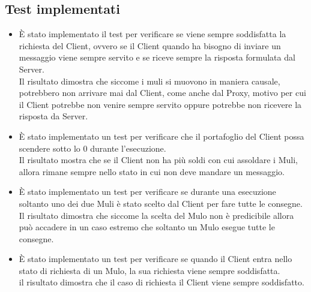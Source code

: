 \documentclass[13pt,a4paper]{article}
\begin{document}
\subsection{Test implementati}
\begin{itemize}
	\item È stato implementato il test per verificare se viene sempre soddisfatta la richiesta del Client, ovvero se il Client quando ha bisogno di inviare un messaggio viene sempre servito e se riceve sempre la risposta formulata dal Server.\\
	Il risultato dimostra che siccome i muli si muovono in maniera causale, potrebbero non arrivare mai dal Client, come anche dal Proxy, motivo per cui il Client potrebbe non venire sempre servito oppure potrebbe non ricevere la risposta da Server.
	\item È stato implementato un test per verificare che il portafoglio del Client possa scendere sotto lo 0 durante l'esecuzione.\\
	Il risultato mostra che se il Client non ha più soldi con cui assoldare i Muli, allora rimane sempre nello stato in cui non deve mandare un messaggio.
	\item È stato implementato un test per verificare se durante una esecuzione soltanto uno dei due Muli è stato scelto dal Client per fare tutte le consegne.\\
	Il risultato dimostra che siccome la scelta del Mulo non è predicibile allora può accadere in un caso estremo che soltanto un Mulo esegue tutte le consegne.
	\item È stato implementato un test per verificare se quando il Client entra nello stato di richiesta di un Mulo, la sua richiesta viene sempre soddisfatta.\\
	il risultato dimostra che il caso di richiesta il Client viene sempre soddisfatto.
	
\end{itemize}
	
	
\end{document}
